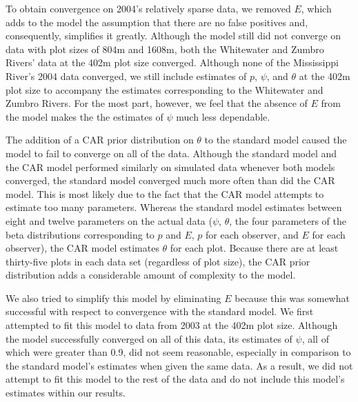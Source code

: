 \documentclass[12pt]{article}
\begin{document}
    To obtain convergence on 2004's relatively sparse data, we removed \(E\),
    which adds to the model the assumption that there are no false positives
    and, consequently, simplifies it greatly. Although the model still did not
    converge on data with plot sizes of 804m and 1608m, both the Whitewater and
    Zumbro Rivers' data at the 402m plot size converged. Although none of the
    Mississippi River's 2004 data converged, we still include estimates of
    \(p\), \(\psi\), and \(\theta\) at the 402m plot size to accompany the
    estimates corresponding to the Whitewater and Zumbro Rivers. For the most
    part, however, we feel that the absence of \(E\) from the model makes the
    the estimates of \(\psi\) much less dependable.

    The addition of a CAR prior distribution on \(\theta\) to the standard model
    caused the model to fail to converge on all of the data. Although the
    standard model and the CAR model performed similarly on simulated data
    whenever both models converged, the standard model converged much more often
    than did the CAR model. This is most likely due to the fact that the CAR
    model attempts to estimate too many parameters. Whereas the standard model
    estimates between eight and twelve parameters on the actual data (\(\psi\),
    \(\theta\), the four parameters of the beta distributions corresponding to
    \(p\) and \(E\), \(p\) for each observer, and \(E\) for each observer), the
    CAR model estimates \(\theta\) for each plot. Because there are at least
    thirty-five plots in each data set (regardless of plot size), the CAR prior
    distribution adds a considerable amount of complexity to the model.

    We also tried to simplify this model by eliminating \(E\) because this was
    somewhat successful with respect to convergence with the standard model. We
    first attempted to fit this model to data from 2003 at the 402m plot size.
    Although the model successfully converged on all of this data, its estimates
    of \(\psi\), all of which were greater than 0.9, did not seem reasonable,
    especially in comparison to the standard model's estimates when given the
    same data. As a result, we did not attempt to fit this model to the rest of
    the data and do not include this model's estimates within our results.
\end{document}
